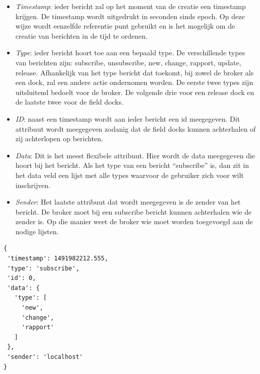 \begin{itemize}
\item \emph{Timestamp}: ieder bericht zal op het moment van de creatie een timestamp krijgen.
De timestamp wordt uitgedrukt in seconden sinds epoch.
Op deze wijze wordt eenzelfde referentie punt gebruikt en is het mogelijk om de creatie van berichten in de tijd te ordenen.
\item \emph{Type}: ieder bericht hoort toe aan een bepaald type.
De verschillende types van berichten zijn: subscribe, unsubscribe, new, change, rapport, update, release.
Afhankelijk van het type bericht dat toekomt, bij zowel de broker als een dock, zal een andere actie ondernomen worden.
De eerste twee types zijn uitsluitend bedoelt voor de broker.
De volgende drie voor een release dock en de laatste twee voor de field docks.
\item \emph{ID}: naast een timestamp wordt aan ieder bericht een id meegegeven. 
Dit attribuut wordt meegegeven zodanig dat de field docks kunnen achterhalen of zij achterlopen op berichten.
\item \emph{Data}: Dit is het meest flexibele attribuut. 
Hier wordt de data meegegeven die hoort bij het bericht.
Als het type van een bericht ``subscribe'' is, dan zit in het data veld een lijst met alle types waarvoor de gebruiker zich voor wilt inschrijven.
\item \emph{Sender}: Het laatste attribuut dat wordt meegegeven is de zender van het bericht.
De broker moet bij een subscribe bericht kunnen achterhalen wie de zender is.
Op die manier weet de broker wie moet worden toegevoegd aan de nodige lijsten.
\end{itemize}

\begin{minipage}{\linewidth}
\begin{center}
\begin{lstlisting}[caption={Format voor een bericht},label={list:bericht}, xleftmargin=.3\textwidth]
{
 'timestamp': 1491982212.555,
 'type': 'subscribe',
 'id': 0,
 'data': {
   'type': [
     'new',
     'change',
     'rapport'
   ]
 },
 'sender': 'localhost'
}
\end{lstlisting}
\end{center}
\end{minipage}

